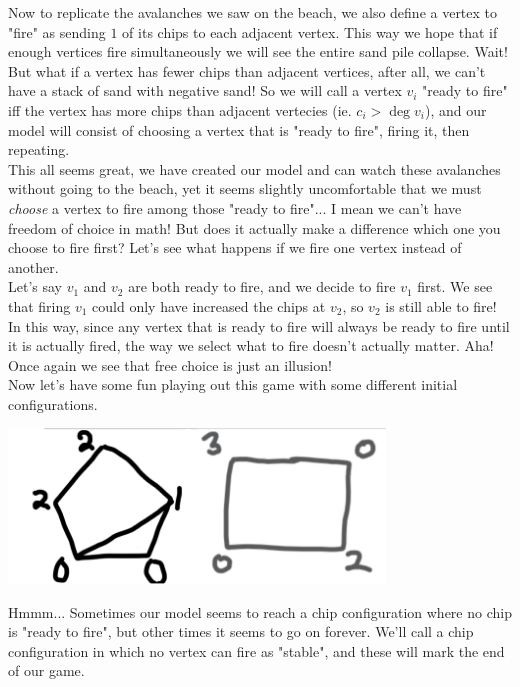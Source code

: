 \documentclass{article}
\begin{document}
Now to replicate the avalanches we saw on the beach, we also define a vertex to "fire" as sending $1$ of its chips to each adjacent vertex. This way we hope that if enough vertices fire simultaneously we will see the entire sand pile collapse. Wait! But what if a vertex has fewer chips than adjacent vertices, after all, we can't have a stack of sand with negative sand! So we will call a vertex $v_i$ "ready to fire" iff the vertex has more chips than adjacent vertecies (ie. $c_i>\deg{v_i}$), and our model will consist of choosing a vertex that is "ready to fire", firing it, then repeating.\\

This all seems great, we have created our model and can watch these avalanches without going to the beach, yet it seems slightly uncomfortable that we must \emph{choose} a vertex to fire among those "ready to fire"... I mean we can't have freedom of choice in math! But does it actually make a difference which one you choose to fire first? Let's see what happens if we fire one vertex instead of another.\\

Let's say $v_1$ and $v_2$ are both ready to fire, and we decide to fire $v_1$ first. We see that firing $v_1$ could only have increased the chips at $v_2$, so $v_2$ is still able to fire! In this way, since any vertex that is ready to fire will always be ready to fire until it is actually fired, the way we select what to fire doesn't actually matter. Aha! Once again we see that free choice is just an illusion!\\

Now let's have some fun playing out this game with some different initial configurations. 

\begin{center}
    \includegraphics[width=10cm, scale=1]{images/example configs.png}
\end{center}

Hmmm... Sometimes our model seems to reach a chip configuration where no chip is "ready to fire", but other times it seems to go on forever. We'll call a chip configuration in which no vertex can fire as "stable", and these will mark the end of our game. \\
\end{document}
